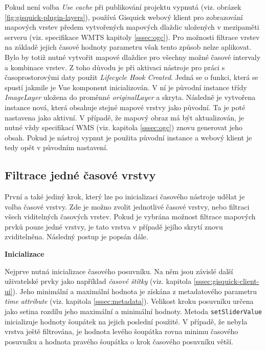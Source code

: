 Pokud není volba \textit{Use cache} při publikování projektu vypnutá
(viz. obrázek \ref{fig:gisquick-plugin-layers}), používá Gisquick
webový klient pro zobrazování mapových vrstev předem vytvořených
mapových dlaždic uložených v mezipaměti serveru (viz. specifikace WMTS
kapitoly \ref{sssec:ogc}). Pro možnosti filtrace vrstev na základě
jejich časové hodnoty parametru však tento způsob nelze
aplikovat. Bylo by totiž nutné vytvořit mapové dlaždice pro všechny
možné časové intervaly a kombinace vrstev. Z toho důvodu je při
aktivaci nástroje pro práci s časoprostorovými daty
použit \textit{Lifecycle Hook Created}. Jedná se o funkci, která se
spustí jakmile je Vue komponent inicializován. V ní je původní
instance třídy \textit{ImageLayer} uložena do
proměnné \textit{originalLayer} a skryta. Následně je vytvořena
instance nová, která obsahuje stejné mapové vrstvy jako původní. Ta je
poté nastavena jako aktivní. V případě, že mapový obraz má být
aktualizován, je nutné vždy specifikací WMS
(viz. kapitola \ref{sssec:ogc}) znovu generovat jeho obsah. Pokud je
nástroj vypnut je použita původní instance a webový klient je tedy
opět v původním nastavení.

\subsection{Filtrace jedné časové vrstvy}
\label{sssec:one-layer-filtration}

První a také jediný krok, který lze po inicializaci časového nástroje
udělat je volba časové vrstvy. Zde je možno zvolit jednotlivé časové
vrstvy, nebo filtraci všech viditelných časových vrstev. Pokud je
vybrána možnost filtrace mapových prvků pouze jedné vrstvy, je tato
vrstva v případě jejího skrytí znovu zviditelněna. Následný postup
je popsán dále.

\bigskip
\noindent \textbf{Inicializace}

Nejprve nutná inicializace časového posuvníku. Na něm jsou závislé
další uživatelské prvky jako například \textit{časové štítky}
(viz. kapitola \ref{sssec:gisquick-client-ui}). Jeho minimální a maximální
hodnota je získána z metadatového parametru \textit{time\textunderscore
attribute} (viz. kapitola \ref{sssec:metadata}). Velikost kroku posuvníku
určena jako setina rozdílu jeho maximální a minimální hodnoty. Metoda
\verb|setSliderValue| inicializuje hodnoty šoupátek na jejich poslední
použité. V případě, že nebyla vrstva ještě filtrována, je hodnota
levého šoupátka rovna minimu časového posuvníku a hodnota pravého
šoupátka o krok časového posuvníku větší.

